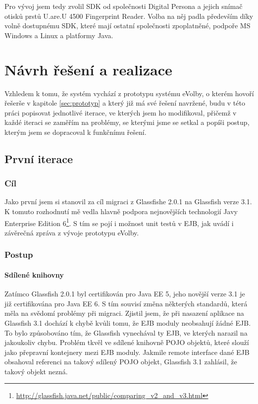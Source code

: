 \documentclass[11pt,twoside,a4paper]{book}
\begin{document}
Pro vývoj jsem tedy zvolil SDK od společnosti Digital Persona a jejich snímač otisků prstů U.are.U 4500 Fingerprint Reader. Volba na něj padla především díky volně dostupnému SDK, které mají ostatní společnosti zpoplatněné, podpoře MS Windows a Linux a platformy Java.

\chapter{Návrh řešení a realizace}


 
Vzhledem k tomu, že systém vychází z prototypu systému eVolby\cite{www:prototyp}, o kterém hovoří řešerše v kapitole \ref{sec:prototyp} a který již má své řešení navržené, budu v této práci popisovat jednotlivé iterace, ve kterých jsem ho modifikoval, přičemž v každé iteraci se zaměřím na problémy, se kterými jsme se setkal a popíši postup, kterým jsem se dopracoval k funkčnímu řešení. 

\section{První iterace} \label{sec:iterace:prvni}

\subsection{Cíl}

Jako první jsem si stanovil za cíl migraci z Glassfishe 2.0.1 na Glassfish verze 3.1. K tomuto rozhodnutí mě vedla hlavně podpora nejnovějších technologií Javy Enterprise Edition 6\footnote{\url{http://glassfish.java.net/public/comparing_v2_and_v3.html}}. S tím se pojí i možnost unit testů v EJB, jak uvádí i závěrečná zpráva z vývoje prototypu eVolby\cite{www:prototyp}.

\subsection{Postup}

\subsubsection{Sdílené knihovny}

Zatímco Glassfish 2.0.1 byl certifikován pro Java EE 5, jeho novější verze 3.1 je již certifikována pro Java EE 6. S tím souvisí změna některých standardů, která měla na svědomí problémy při migraci. Zjistil jsem, že při nasazení aplikace na Glassfish 3.1 dochází k chybě kvůli tomu, že EJB moduly neobsahují žádné EJB. To bylo způsobováno tím, že Glassfish vynechával ty EJB, ve kterých narazil na jakoukoliv chybu. Problém tkvěl ve sdílené knihovně POJO objektů, které slouží jako přepravní kontejnery mezi EJB moduly. Jakmile remote interface dané EJB obsahoval referenci na takový sdílený POJO objekt, Glassfish 3.1 zahlásil, že takový objekt nezná.
\end{document}
